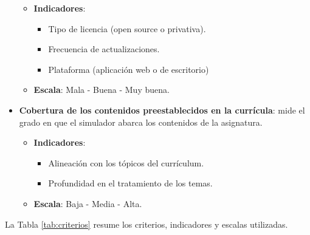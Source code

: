 \documentclass[12pt,oneside]{templates/unerthesis}
\providecommand{\tightlist}{%
  \setlength{\itemsep}{0pt}\setlength{\parskip}{0pt}}
\begin{document}
\begin{itemize}
  \begin{itemize}
  \tightlist
  \item
    \textbf{Indicadores}:

    \begin{itemize}
    \tightlist
    \item
      Tipo de licencia (open source o privativa).
    \item
      Frecuencia de actualizaciones.
    \item
      Plataforma (aplicación web o de escritorio)
    \end{itemize}
  \item
    \textbf{Escala}: Mala - Buena - Muy buena.
  \end{itemize}
\item
  \textbf{Cobertura de los contenidos preestablecidos en la currícula}: mide el grado en que el simulador abarca los contenidos de la asignatura.

  \begin{itemize}
  \tightlist
  \item
    \textbf{Indicadores}:

    \begin{itemize}
    \tightlist
    \item
      Alineación con los tópicos del currículum.
    \item
      Profundidad en el tratamiento de los temas.
    \end{itemize}
  \item
    \textbf{Escala}: Baja - Media - Alta.
  \end{itemize}
\end{itemize}

La Tabla \ref{tab:criterios} resume los criterios, indicadores y escalas utilizadas.
\end{document}
